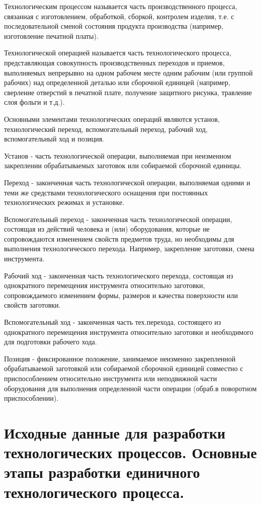 \documentclass[unicode, 12pt, a4paper, oneside]{article}
\begin{document}
Технологическим процессом называется часть производственного процесса, связанная с изготовлением, обработкой, сборкой, контролем изделия, т.е. с последовательной сменой состояния продукта производства (например, изготовление печатной платы).

Технологической операцией называется часть технологического процесса, представляющая совокупность производственных переходов и приемов, выполняемых непрерывно на одном рабочем месте одним рабочим (или группой рабочих) над определенной деталью или сборочной единицей (например, сверление отверстий в печатной плате, получение защитного рисунка, травление слоя фольги и т.д.).

Основными элементами технологических операций являются установ, технологический переход, вспомогательный переход, рабочий ход, вспомогательный ход и позиция.

Установ - часть технологической операции, выполняемая при неизменном закреплении обрабатываемых заготовок или собираемой сборочной единицы.

Переход - законченная часть технологической операции, выполняемая одними и теми же средствами технологического оснащения при постоянных технологических режимах и установке.

Вспомогательный переход - законченная часть технологической операции, состоящая из действий человека и (или) оборудования, которые не сопровождаются изменением свойств предметов труда, но необходимы для выполнения технологического перехода. Например, закрепление заготовки, смена инструмента.

Рабочий ход - законченная часть технологического перехода, состоящая из однократного перемещения инструмента относительно заготовки, сопровождаемого изменением формы, размеров и качества поверхности или свойств заготовки.

Вспомогательный ход - законченная часть тех.перехода, состоящего из однократного перемещения инструмента относительно заготовки и необходимого для подготовки рабочего хода.

Позиция - фиксированное положение, занимаемое неизменно закрепленной обрабатываемой заготовкой или собираемой сборочной единицей совместно с приспособлением относительно инструмента или неподвижной части оборудования для выполнения определенной части операции (обраб.в поворотном приспособлении).


\section{Исходные данные для разработки технологических процессов. Основные этапы разработки единичного технологического процесса.}
\end{document}
